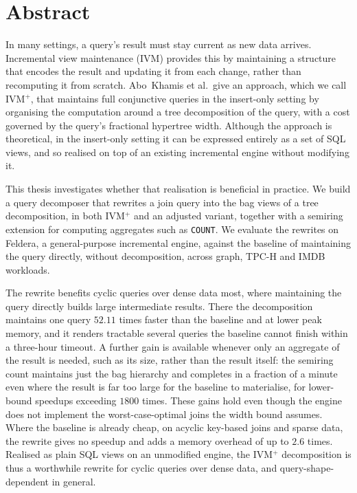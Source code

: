\chapter*{Abstract}

In many settings, a query's result must stay current as new data arrives. Incremental view maintenance (IVM) provides this by maintaining a structure that encodes the result and updating it from each change, rather than recomputing it from scratch. Abo~Khamis et al.\ give an approach, which we call IVM$^+$, that maintains full conjunctive queries in the insert-only setting by organising the computation around a tree decomposition of the query, with a cost governed by the query's fractional hypertree width. Although the approach is theoretical, in the insert-only setting it can be expressed entirely as a set of SQL views, and so realised on top of an existing incremental engine without modifying it.

This thesis investigates whether that realisation is beneficial in practice. We build a query decomposer that rewrites a join query into the bag views of a tree decomposition, in both IVM$^+$ and an adjusted variant, together with a semiring extension for computing aggregates such as \texttt{COUNT}. We evaluate the rewrites on Feldera, a general-purpose incremental engine, against the baseline of maintaining the query directly, without decomposition, across graph, TPC-H and IMDB workloads.

The rewrite benefits cyclic queries over dense data most, where maintaining the query directly builds large intermediate results. There the decomposition maintains one query $52.11$ times faster than the baseline and at lower peak memory, and it renders tractable several queries the baseline cannot finish within a three-hour timeout. A further gain is available whenever only an aggregate of the result is needed, such as its size, rather than the result itself: the semiring count maintains just the bag hierarchy and completes in a fraction of a minute even where the result is far too large for the baseline to materialise, for lower-bound speedups exceeding $1800$ times. These gains hold even though the engine does not implement the worst-case-optimal joins the width bound assumes. Where the baseline is already cheap, on acyclic key-based joins and sparse data, the rewrite gives no speedup and adds a memory overhead of up to $2.6$ times. Realised as plain SQL views on an unmodified engine, the IVM$^+$ decomposition is thus a worthwhile rewrite for cyclic queries over dense data, and query-shape-dependent in general.
